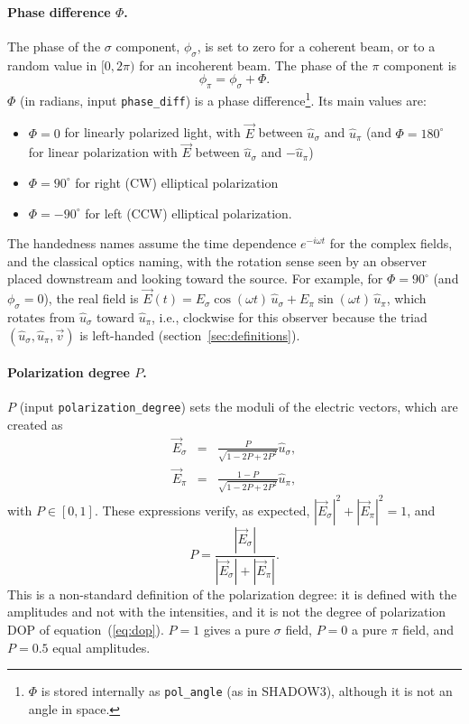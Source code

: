 \documentclass{iucr}
\begin{document}
\paragraph{Phase difference $\Phi$.}
The phase of the $\sigma$ component, $\phi_\sigma$, is set to zero for a coherent beam, or to a random value in $[0,2\pi)$ for an incoherent beam. The phase of the $\pi$ component is
\begin{equation}\label{eq:Phi}
   \phi_\pi=\phi_\sigma+\Phi.
\end{equation}
$\Phi$ (in radians, input {\tt phase\_diff}) is a phase difference\footnote{$\Phi$ is stored internally as {\tt pol\_angle} (as in SHADOW3), although it is not an angle in space.}. Its main values are:
\begin{itemize}
 \item $\Phi=0$ for linearly polarized light, with $\vec{E}$ between $\hat{u}_\sigma$ and $\hat{u}_\pi$ (and $\Phi=180^{\circ}$ for linear polarization with $\vec{E}$ between $\hat{u}_\sigma$ and $-\hat{u}_\pi$)
 \item $\Phi=90^{\circ}$ for right (CW) elliptical polarization
 \item $\Phi=-90^{\circ}$ for left (CCW) elliptical polarization.
\end{itemize}
The handedness names assume the time dependence $e^{-i\omega t}$ for the complex fields, and the classical optics naming, with the rotation sense seen by an observer placed downstream and looking toward the source. For example, for $\Phi=90^{\circ}$ (and $\phi_\sigma=0$), the real field is $\vec{E}(t)=E_\sigma \cos(\omega t)\,\hat{u}_\sigma + E_\pi \sin(\omega t)\,\hat{u}_\pi$, which rotates from $\hat{u}_\sigma$ toward $\hat{u}_\pi$, i.e., clockwise for this observer because the triad $(\hat{u}_\sigma, \hat{u}_\pi, \vec{v})$ is left-handed (section~\ref{sec:definitions}).

\paragraph{Polarization degree $P$.}
$P$ (input {\tt polarization\_degree}) sets the moduli of the electric vectors, which are created as
\begin{eqnarray}\label{eq:EfromP}
   \vec{E}_\sigma &=& \frac{P}{\sqrt{1-2 P+ 2 P^2}} \hat{u}_\sigma, \nonumber \\
   \vec{E}_\pi    &=& \frac{1-P}{\sqrt{1-2 P+ 2 P^2}} \hat{u}_\pi,
\end{eqnarray}
with $P\in[0,1]$. These expressions verify, as expected, $|\vec{E}_\sigma|^2 + |\vec{E}_\pi|^2 = 1$, and
\begin{equation}\label{eq:Pdef}
   P=\frac{|\vec{E}_\sigma|}{|\vec{E}_\sigma|+|\vec{E}_\pi|}.
\end{equation}
This is a non-standard definition of the polarization degree: it is defined with the amplitudes and not with the intensities, and it is not the degree of polarization DOP of equation~(\ref{eq:dop}). $P=1$ gives a pure $\sigma$ field, $P=0$ a pure $\pi$ field, and $P=0.5$ equal amplitudes.
\end{document}
